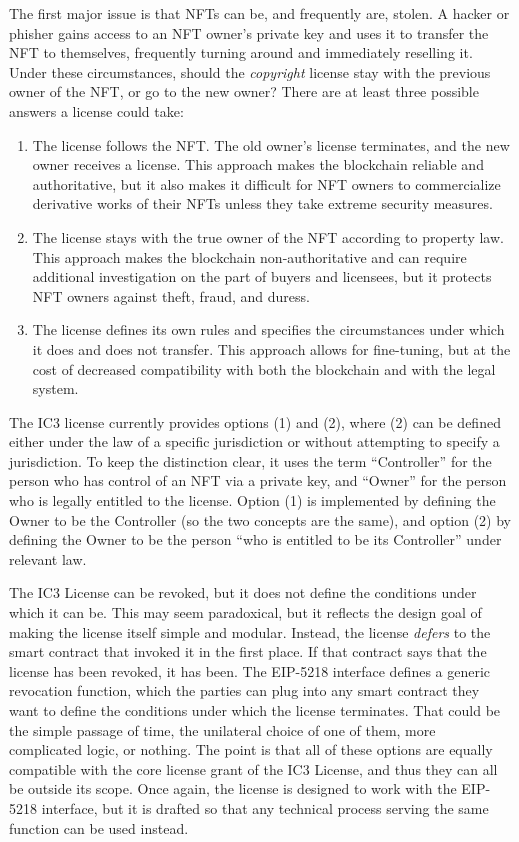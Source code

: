 \documentclass{article}
\newcommand{\eiplicense}{EIP-5218\xspace}
\begin{document}
The first major issue is that NFTs can be, and frequently are, stolen. A hacker or phisher gains access to an NFT owner's private key and uses it to transfer the NFT to themselves, frequently turning around and immediately reselling it. Under these circumstances, should the \emph{copyright} license stay with the previous owner of the NFT, or go to the new owner? There are at least three possible answers a license could take:
\begin{enumerate}
\item The license follows the NFT. The old owner's license terminates, and the new owner receives a license. This approach makes the blockchain reliable and authoritative, but it also makes it difficult for NFT owners to commercialize derivative works of their NFTs unless they take extreme security measures.
\item The license stays with the true owner of the NFT according to property law. This approach makes the blockchain non-authoritative and can require additional investigation on the part of buyers and licensees, but it protects NFT owners against theft, fraud, and duress.
\item The license defines its own rules and specifies the circumstances under which it does and does not transfer. This approach allows for fine-tuning, but at the cost of decreased compatibility with both the blockchain and with the legal system.
\end{enumerate}

The IC3 license currently provides options (1) and (2), where (2) can be defined either under the law of a specific jurisdiction or without attempting to specify a jurisdiction. To keep the distinction clear, it uses the term ``Controller'' for the person who has control of an NFT via a private key, and ``Owner'' for the person who is legally entitled to the license. Option (1) is implemented by defining the Owner to be the Controller (so the two concepts are the same), and option (2) by defining the Owner to be the person ``who is entitled to be its Controller'' under relevant law.

The IC3 License can be revoked, but it does not define the conditions under which it can be. This may seem paradoxical, but it reflects the design goal of making the license itself simple and modular. Instead, the license \emph{defers} to the smart contract that invoked it in the first place. If that contract says that the license has been revoked, it has been. The \eiplicense interface defines a generic revocation function, which the parties can plug into any smart contract they want to define the conditions under which the license terminates. That could be the simple passage of time, the unilateral choice of one of them, more complicated logic, or nothing. The point is that all of these options are equally compatible with the core license grant of the IC3 License, and thus they can all be outside its scope. Once again, the license is designed to work with the \eiplicense interface, but it is drafted so that any technical process serving the same function can be used instead.
\end{document}
